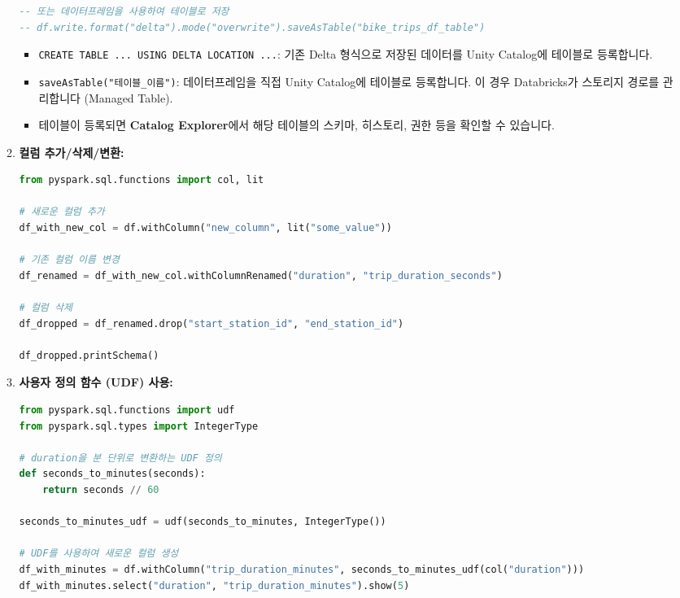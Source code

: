 \documentclass[11pt,a4paper]{article}
\begin{document}
\begin{itemize}
\begin{enumerate}
\begin{lstlisting}[language=sql, caption={Delta 테이블 생성 및 등록 예시}]
-- 또는 데이터프레임을 사용하여 테이블로 저장
-- df.write.format("delta").mode("overwrite").saveAsTable("bike_trips_df_table")
        \end{lstlisting}
        \begin{itemize}
            \item \texttt{CREATE TABLE ... USING DELTA LOCATION ...}: 기존 Delta 형식으로 저장된 데이터를 Unity Catalog에 테이블로 등록합니다.
            \item \texttt{saveAsTable("테이블_이름")}: 데이터프레임을 직접 Unity Catalog에 테이블로 등록합니다. 이 경우 Databricks가 스토리지 경로를 관리합니다 (Managed Table).
            \item 테이블이 등록되면 \textbf{Catalog Explorer}에서 해당 테이블의 스키마, 히스토리, 권한 등을 확인할 수 있습니다.
        \end{itemize}
    \item \textbf{컬럼 추가/삭제/변환:}
        \begin{lstlisting}[language=python, caption={데이터프레임 컬럼 조작 예시}]
from pyspark.sql.functions import col, lit

# 새로운 컬럼 추가
df_with_new_col = df.withColumn("new_column", lit("some_value"))

# 기존 컬럼 이름 변경
df_renamed = df_with_new_col.withColumnRenamed("duration", "trip_duration_seconds")

# 컬럼 삭제
df_dropped = df_renamed.drop("start_station_id", "end_station_id")

df_dropped.printSchema()
        \end{lstlisting}
    \item \textbf{사용자 정의 함수 (UDF) 사용:}
        \begin{lstlisting}[language=python, caption={사용자 정의 함수 (UDF) 예시}]
from pyspark.sql.functions import udf
from pyspark.sql.types import IntegerType

# duration을 분 단위로 변환하는 UDF 정의
def seconds_to_minutes(seconds):
    return seconds // 60

seconds_to_minutes_udf = udf(seconds_to_minutes, IntegerType())

# UDF를 사용하여 새로운 컬럼 생성
df_with_minutes = df.withColumn("trip_duration_minutes", seconds_to_minutes_udf(col("duration")))
df_with_minutes.select("duration", "trip_duration_minutes").show(5)
        \end{lstlisting}
\end{enumerate}

\newpage


\end{itemize}
\end{document}
